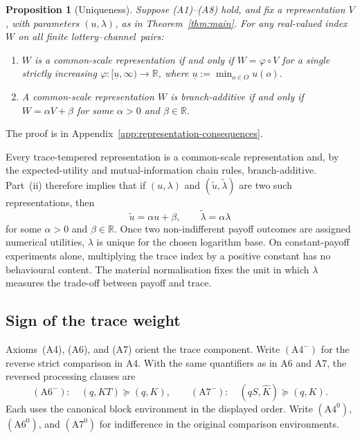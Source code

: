 \documentclass[11pt,a4paper]{article}
\newtheorem{proposition}[theorem]{Proposition}
\theoremstyle{definition}
\newcommand{\1}{\mathbf 1}
\begin{document}
\begin{samepage}
\begin{proposition}[Uniqueness]\label{prop:uniqueness}
Suppose \textup{(A1)--(A8)} hold, and fix a representation $V$, with parameters $(u,\lambda)$, as in
Theorem~\ref{thm:main}.  For any real-valued index $W$ on all finite lottery--channel~pairs:
\begin{enumerate}[label=\textup{(\roman*)},leftmargin=*]
\item $W$ is a common-scale representation if and only if $W=\varphi\circ V$ for a single strictly increasing
$\varphi:[\underline u,\infty)\to\mathbb R$, where $\underline u:=\min_{o\in O}u(o)$.
\item A common-scale representation $W$ is branch-additive if and only if
$W=\alpha V+\beta$ for some $\alpha>0$ and $\beta\in\mathbb R$.
\end{enumerate}
\end{proposition}
\end{samepage}

The proof is in Appendix~\ref{app:representation-consequences}.

Every trace-tempered representation is a common-scale representation and, by the expected-utility and
mutual-information chain rules, branch-additive.  Part~\textup{(ii)} therefore implies that if $(u,\lambda)$ and
$(\widetilde u,\widetilde\lambda)$ are two such representations, then
\[
 \widetilde u=\alpha u+\beta,
 \qquad
 \widetilde\lambda=\alpha\lambda
\]
for some $\alpha>0$ and $\beta\in\mathbb R$.  Once two non-indifferent payoff outcomes are assigned numerical
utilities, $\lambda$ is unique for the chosen logarithm base.  On constant-payoff experiments alone, multiplying the trace index by a positive constant has no behavioural
content.  The material normalisation fixes the unit in which $\lambda$ measures the trade-off between payoff
and trace.

\subsection{Sign of the trace weight}

Axioms~\textup{(A4)}, \textup{(A6)}, and \textup{(A7)} orient the trace component.
Write $(\mathrm{A}4^-)$ for the reverse strict comparison in A4.  With the same quantifiers as in A6 and A7,
the reversed processing clauses are
\[
 (\mathrm{A}6^-):\quad(q,KT)\succeq(q,K),
 \qquad
 (\mathrm{A}7^-):\quad(qS,\widehat K)\succeq(q,K).
\]
Each uses the canonical block environment in the displayed order.  Write $(\mathrm{A}4^0)$,
$(\mathrm{A}6^0)$, and $(\mathrm{A}7^0)$ for indifference in the original comparison environments.
\end{document}
